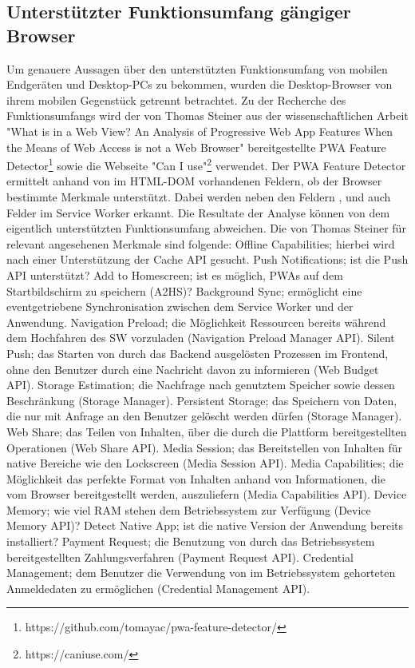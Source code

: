 \subsection{Unterstützter Funktionsumfang gängiger Browser}
\label{subsec:unterstuetzterfunktionsumfanggaengigerbrowser}
Um genauere Aussagen über den unterstützten Funktionsumfang von mobilen Endgeräten
und Desktop-PCs zu bekommen, wurden die Desktop-Browser von ihrem mobilen
Gegenstück getrennt betrachtet. Zu der Recherche des Funktionsumfangs wird
der von Thomas Steiner aus der wissenschaftlichen Arbeit "What is
in a Web View? An Analysis of Progressive Web App Features When the
Means of Web Access is not a Web Browser" bereitgestellte
PWA Feature Detector\footnote{https://github.com/tomayac/pwa-feature-detector/} sowie 
die Webseite "Can I use"\footnote{https://caniuse.com/} verwendet.
Der PWA Feature Detector ermittelt anhand von im HTML-DOM
vorhandenen Feldern, ob der Browser bestimmte Merkmale unterstützt.
Dabei werden neben den Feldern ,  und 
auch Felder im Service Worker erkannt. Die Resultate der Analyse können von dem
eigentlich unterstützten Funktionsumfang abweichen. Die von Thomas
Steiner für relevant angesehenen Merkmale sind folgende:
Offline Capabilities; hierbei wird nach
einer Unterstützung der Cache API gesucht. Push Notifications;
ist die Push API unterstützt? Add to Homescreen; ist es möglich, PWAs auf
dem Startbildschirm zu speichern (A2HS)? Background Sync; ermöglicht eine eventgetriebene Synchronisation
zwischen dem Service Worker und der Anwendung. Navigation Preload; die Möglichkeit
Ressourcen bereits während dem Hochfahren des SW vorzuladen
(Navigation Preload Manager API). Silent Push; das Starten von durch das
Backend ausgelösten Prozessen im Frontend, ohne den Benutzer
durch eine Nachricht davon zu informieren (Web Budget API).
Storage Estimation; die Nachfrage nach genutztem Speicher sowie
dessen Beschränkung (Storage Manager). Persistent Storage;
das Speichern von Daten, die nur mit Anfrage an den Benutzer gelöscht
werden dürfen (Storage Manager). Web Share; das Teilen von Inhalten,
über die durch die Plattform bereitgestellten Operationen (Web Share API).
Media Session; das Bereitstellen von Inhalten für native
Bereiche wie den Lockscreen (Media Session API). Media Capabilities;
die Möglichkeit das perfekte Format von Inhalten anhand von
Informationen, die vom Browser bereitgestellt werden, auszuliefern (Media Capabilities API).
Device Memory; wie viel RAM stehen dem Betriebssystem zur
Verfügung (Device Memory API)? Detect Native App; ist die native Version
der Anwendung bereits installiert? Payment Request;
die Benutzung von durch das Betriebssystem bereitgestellten
Zahlungsverfahren (Payment Request API). Credential Management;
dem Benutzer die Verwendung von im Betriebssystem gehorteten
Anmeldedaten zu ermöglichen (Credential Management API).\cite[Abschnitt 2.3]{WhatIsInAWebView}

